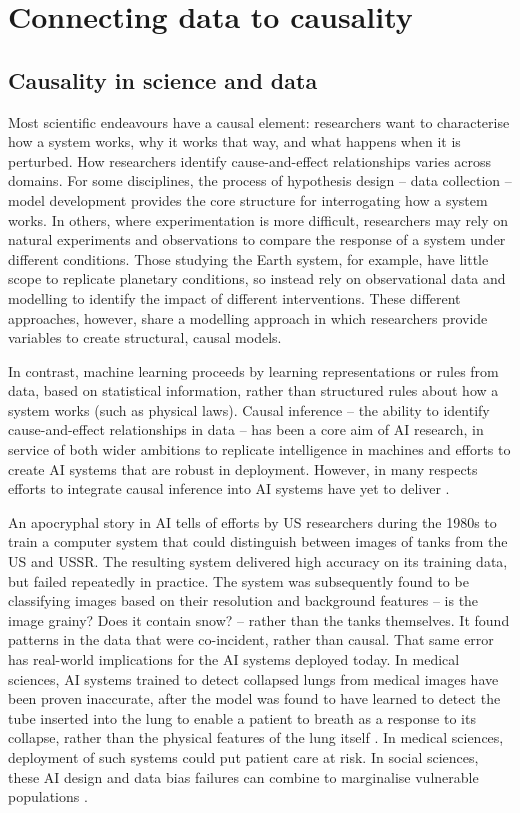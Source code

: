 \section{Connecting data to causality}\label{connecting-data-to-causality}

\subsection{Causality in science and data}\label{causality-in-science-and-data}

Most scientific endeavours have a causal element: researchers want to
characterise how a system works, why it works that way, and what happens
when it is perturbed. How researchers identify cause-and-effect
relationships varies across domains. For some disciplines, the process
of hypothesis design -- data collection -- model development provides
the core structure for interrogating how a system works. In others,
where experimentation is more difficult, researchers may rely on natural
experiments and observations to compare the response of a system under
different conditions. Those studying the Earth system, for example, have
little scope to replicate planetary conditions, so instead rely on
observational data and modelling to identify the impact of different
interventions. These different approaches, however, share a modelling
approach in which researchers provide variables to create structural,
causal models.

In contrast, machine learning proceeds by learning representations or
rules from data, based on statistical information, rather than
structured rules about how a system works (such as physical laws).
Causal inference -- the ability to identify cause-and-effect
relationships in data -- has been a core aim of AI research, in service
of both wider ambitions to replicate intelligence in machines and
efforts to create AI systems that are robust in deployment. However, in
many respects efforts to integrate causal inference into AI systems have
yet to deliver \citep{Scholkopf-representation21}.

An apocryphal story in AI tells of efforts by US researchers during the
1980s to train a computer system that could distinguish between images
of tanks from the US and USSR. The resulting system delivered high
accuracy on its training data, but failed repeatedly in practice. The
system was subsequently found to be classifying images based on their
resolution and background features -- is the image grainy? Does it
contain snow? -- rather than the tanks themselves. It found patterns in
the data that were co-incident, rather than causal. That same error has
real-world implications for the AI systems deployed today. In medical
sciences, AI systems trained to detect collapsed lungs from medical
images have been proven inaccurate, after the model was found to have
learned to detect the tube inserted into the lung to enable a patient to
breath as a response to its collapse, rather than the physical features
of the lung itself \citep{Rueckel-impact20}.
In medical sciences, deployment of such systems could put patient care
at risk. In social sciences, these AI design and data bias failures can
combine to marginalise vulnerable populations \citep{Emspak-prejudice16}.

